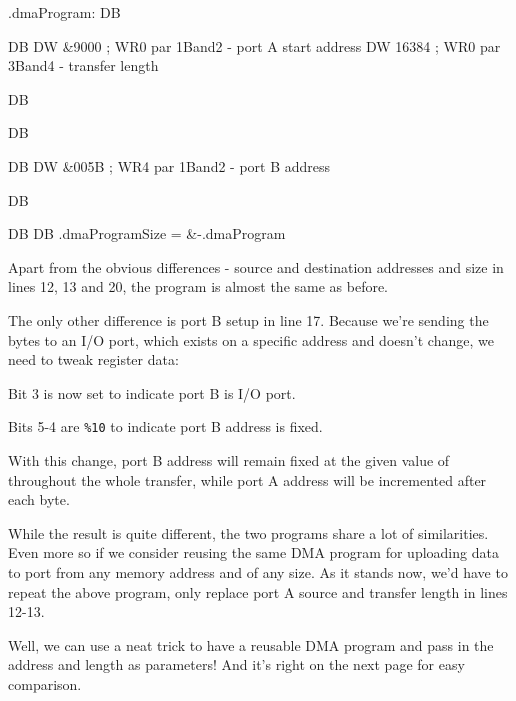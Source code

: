 {\begin{tcblisting}{}
.dmaProgram:
	DB %

	DB %
	DW &9000               ; WR0 par 1Band2 - port A start address
	DW 16384               ; WR0 par 3Band4 - transfer length

	DB %

	DB %

	DB %
	DW &005B               ; WR4 par 1Band2 - port B address

	DB %

	DB %
	DB %
.dmaProgramSize = &-.dmaProgram
\end{tcblisting}

Apart from the obvious differences - source and destination addresses and size in lines 12, 13 and 20, the program is almost the same as before.

The only other difference is port B setup in line 17. Because we're sending the bytes to an I/O port, which exists on a specific address and doesn't change, we need to tweak  register data:

\begin{DMAList}
	\item Bit 3 is now set to indicate port B is I/O port.
	\item Bits 5-4 are {\tt \%10} to indicate port B address is fixed.
\end{DMAList}

With this change, port B address will remain fixed at the given value of  throughout the whole transfer, while port A address will be incremented after each byte.

While the result is quite different, the two programs share a lot of similarities. Even more so if we consider reusing the same DMA program for uploading data to port  from any memory address and of any size. As it stands now, we'd have to repeat the above program, only replace port A source and transfer length in lines 12-13.

Well, we can use a neat trick to have a reusable DMA program and pass in the address and length as parameters! And it's right on the next page for easy comparison.


}
